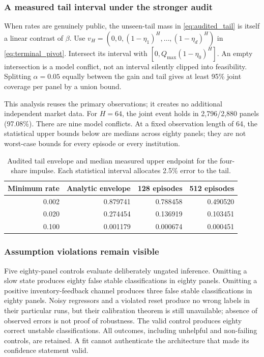 \documentclass[10pt,twocolumn,letterpaper]{article}
\theoremstyle{definition}
\theoremstyle{remark}
\begin{document}
\subsubsection{A measured tail interval under the stronger audit}
When rates are genuinely public, the unseen-tail mass in \cref{eq:audited_tail} is itself a linear contrast of $\beta$. Use
$v_H=(0,0,(1-\eta_1)^H,\ldots,(1-\eta_d)^H)$ in \cref{eq:terminal_pivot}. Intersect its interval with $[0,Q_{\max}(1-\eta_0)^H]$. An empty intersection is a model conflict, not an interval silently clipped into feasibility. Splitting $\alpha=0.05$ equally between the gain and tail gives at least 95\% joint coverage per panel by a union bound.

This analysis reuses the primary observations; it creates no additional independent market data. For $H=64$, the joint event holds in 2,796/2,880 panels (97.08\%). There are nine model conflicts. At a fixed observation length of 64, the statistical upper bounds below are medians across eighty panels; they are not worst-case bounds for every episode or every institution.
\begin{table}[htbp]
\centering\small
\caption{Audited tail envelope and median measured upper endpoint for the four-share impulse. Each statistical interval allocates 2.5\% error to the tail.}
\begin{tabular}{r r r r}
\toprule
Minimum rate & Analytic envelope & 128 episodes & 512 episodes\\
\midrule
0.002 & 0.879741 & 0.788458 & 0.490520\\
0.020 & 0.274454 & 0.136919 & 0.103451\\
0.100 & 0.001179 & 0.000674 & 0.000451\\
\bottomrule
\end{tabular}
\end{table}

\subsubsection{Assumption violations remain visible}
Five eighty-panel controls evaluate deliberately ungated inference. Omitting a slow state produces eighty false stable classifications in eighty panels. Omitting a positive inventory-feedback channel produces three false stable classifications in eighty panels. Noisy regressors and a violated reset produce no wrong labels in their particular runs, but their calibration theorem is still unavailable; absence of observed errors is not proof of robustness. The valid control produces eighty correct unstable classifications. All outcomes, including unhelpful and non-failing controls, are retained. A fit cannot authenticate the architecture that made its confidence statement valid.
\end{document}
